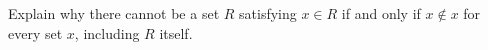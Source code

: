 Explain why there cannot be a set $R$ satisfying $x\in R$ if and only if $x\notin x$ for every set $x$, including $R$ itself.
